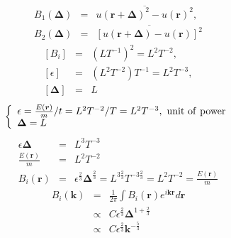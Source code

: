 \documentclass[aps,onecolumn,pra]{revtex4}
\begin{document}
    \begin{eqnarray}
		B_1 (\bm{\Delta}) & = & \overline{u(\bm{r}+\bm{\Delta})^2 - u(\bm{r})^2}, \\
		B_2 (\bm{\Delta}) & = & \overline{\left[
				u(\bm{r}+\bm{\Delta})-u(\bm{r})
			\right]^2}
    \end{eqnarray}
    \begin{eqnarray}
		\left[B_i\right] & = & \left( L T^{-1} \right)^2 = L^2 T^{-2}, \\
		\left[\epsilon\right] & = & \left( L^2 T^{-2} \right)T^{-1} = L^2 T^{-3}, \\
		\left[\bm{\Delta}\right] & = & L
    \end{eqnarray}
    \begin{eqnarray}
		\left\{
			\begin{array}{l}
				\epsilon = \frac{E(\bm{r})}{m}/t = L^2 T^{-2} / T = L^2 T^{-3}, \ {\rm unit \ of \ power}
				\\
				\bm{\Delta} = L
			\end{array}
		\right.
    \end{eqnarray}
    \begin{eqnarray}
		\epsilon \bm{\Delta} & = & L^3 T^{-3} \\
		\frac{E(\bm{r})}{m} & = & L^2 T^{-2} \\
		B_i(\bm{r}) & = & \epsilon^{\frac{2}{3}} \bm{\Delta}^{\frac{2}{3}} = L^{3 \frac{2}{3}} T^{-3 \frac{2}{3}} = L^2 T^{-2} = \frac{E(\bm{r})}{m}
    \end{eqnarray}
    \begin{eqnarray}
		B_i(\bm{k}) & = & \frac{1}{2 \pi} \int B_i(\bm{r}) e^{i \bm{k} \bm{r}} d\bm{r}
		\\
		& \propto & C \epsilon^{\frac{2}{3}} \bm{\Delta}^{1 + \frac{2}{3}}
		\\
		& \propto & C \epsilon^{\frac{2}{3}} \bm{k}^{-\frac{5}{3}}
    \end{eqnarray}
\end{document}
